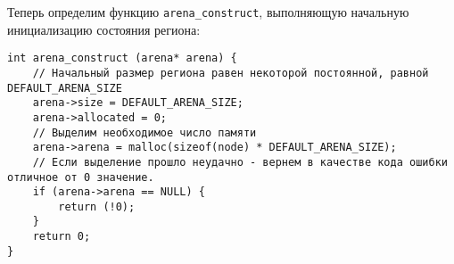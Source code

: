 Теперь определим функцию \verb|arena_construct|, выполняющую начальную
инициализацию состояния региона:

\begin{verbatim}
int arena_construct (arena* arena) {
    // Начальный размер региона равен некоторой постоянной, равной DEFAULT_ARENA_SIZE
    arena->size = DEFAULT_ARENA_SIZE;
    arena->allocated = 0;
    // Выделим необходимое число памяти
    arena->arena = malloc(sizeof(node) * DEFAULT_ARENA_SIZE);
    // Если выделение прошло неудачно - вернем в качестве кода ошибки отличное от 0 значение.
    if (arena->arena == NULL) {
        return (!0);
    }
    return 0;
}
\end{verbatim}